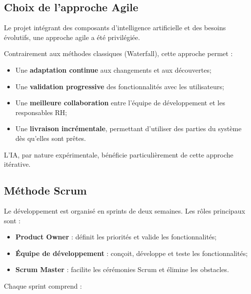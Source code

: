 \subsection{Choix de l'approche Agile}
\label{subsec:approche-agile}

Le projet intégrant des composants d'intelligence artificielle et des besoins évolutifs, une approche agile a été privilégiée.

Contrairement aux méthodes classiques (Waterfall), cette approche permet :

\begin{itemize}
    \item Une \textbf{adaptation continue} aux changements et aux découvertes;
    
    \item Une \textbf{validation progressive} des fonctionnalités avec les utilisateurs;
    
    \item Une \textbf{meilleure collaboration} entre l'équipe de développement et les responsables RH;
    
    \item Une \textbf{livraison incrémentale}, permettant d'utiliser des parties du système dès qu'elles sont prêtes.
\end{itemize}

L'IA, par nature expérimentale, bénéficie particulièrement de cette approche itérative.


\subsection{Méthode Scrum}
\label{subsec:methode-scrum}

Le développement est organisé en sprints de deux semaines. Les rôles principaux sont :

\begin{itemize}
    \item \textbf{Product Owner} : définit les priorités et valide les fonctionnalités;
    
    \item \textbf{Équipe de développement} : conçoit, développe et teste les fonctionnalités;
    
    \item \textbf{Scrum Master} : facilite les cérémonies Scrum et élimine les obstacles.
\end{itemize}

Chaque sprint comprend :

